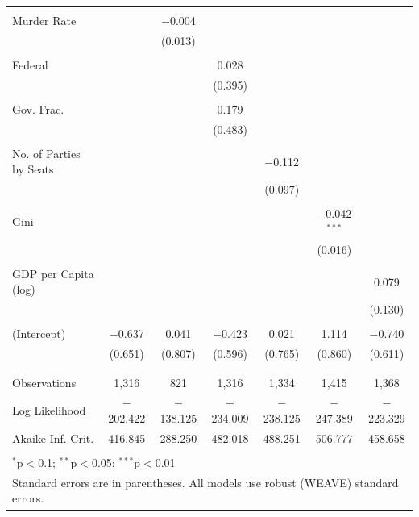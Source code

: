 \documentclass[a4paper]{article}\usepackage[]{graphicx}\usepackage[]{color}
\begin{document}
\begin{table}
\begin{center}
{\begin{tabular}{@{\extracolsep{5pt}}lcccccc}
  & & & & & & \\ 
 Murder Rate &  & $-$0.004 &  &  &  &  \\ 
  &  & (0.013) &  &  &  &  \\ 
  & & & & & & \\ 
 Federal &  &  & 0.028 &  &  &  \\ 
  &  &  & (0.395) &  &  &  \\ 
  & & & & & & \\ 
 Gov. Frac. &  &  & 0.179 &  &  &  \\ 
  &  &  & (0.483) &  &  &  \\ 
  & & & & & & \\ 
 No. of Parties by Seats &  &  &  & $-$0.112 &  &  \\ 
  &  &  &  & (0.097) &  &  \\ 
  & & & & & & \\ 
 Gini &  &  &  &  & $-$0.042$^{***}$ &  \\ 
  &  &  &  &  & (0.016) &  \\ 
  & & & & & & \\ 
 GDP per Capita (log) &  &  &  &  &  & 0.079 \\ 
  &  &  &  &  &  & (0.130) \\ 
  & & & & & & \\ 
 (Intercept) & $-$0.637 & 0.041 & $-$0.423 & 0.021 & 1.114 & $-$0.740 \\ 
  & (0.651) & (0.807) & (0.596) & (0.765) & (0.860) & (0.611) \\ 
  & & & & & & \\ 
\hline \\[-1.8ex] 
Observations & 1,316 & 821 & 1,316 & 1,334 & 1,415 & 1,368 \\ 
Log Likelihood & $-$202.422 & $-$138.125 & $-$234.009 & $-$238.125 & $-$247.389 & $-$223.329 \\ 
Akaike Inf. Crit. & 416.845 & 288.250 & 482.018 & 488.251 & 506.777 & 458.658 \\ 
\hline 
\hline \\[-1.8ex] 
\multicolumn{7}{l}{$^{*}$p$<$0.1; $^{**}$p$<$0.05; $^{***}$p$<$0.01} \\ 
\multicolumn{7}{l}{Standard errors are in parentheses. All models use robust (WEAVE) standard errors.} \\ 
\end{tabular} 

}
\end{center}
\end{table}
\end{document}
